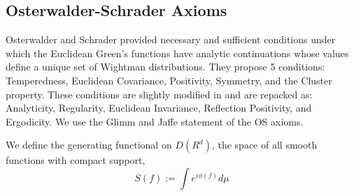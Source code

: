 \documentclass{article}
\newcommand{\1}{\mathbbm{1}}
\theoremstyle{plain}
\theoremstyle{definition}
\numberwithin{equation}{section}
\begin{document}
\subsection{Osterwalder-Schrader Axioms} \label{OSaxioms}

Osterwalder and Schrader \cite{OS1973}  provided necessary and sufficient conditions under which the Euclidean Green's functions have analytic continuations whose values define a unique set of Wightman distributions. They propose 5 conditions: Temperedness, Euclidean Covariance, Positivity, Symmetry, and the Cluster property. These conditions are slightly modified in \cite{GJ1987Axioms} and are repacked as: Analyticity, Regularity, Euclidean Invariance, Reflection Positivity, and Ergodicity. We use the Glimm and Jaffe statement of the OS axioms.  

We define the generating functional on $D(R^d)$, the space of all smooth functions with compact support, 
\begin{equation} \label{eq:genfn}
    S(f):= \int e^{i \phi(f) } d \mu
\end{equation}
\end{document}
